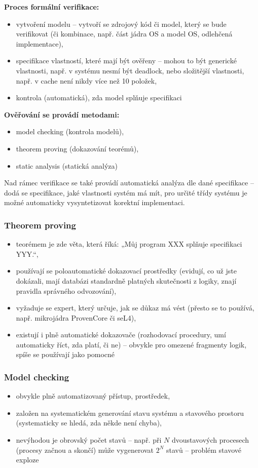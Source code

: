 \documentclass[a4paper, 11pt]{article}
\begin{document}
\textbf{Proces formální verifikace:}
\begin{itemize}
    \item vytvoření modelu -- vytvoří se zdrojový kód či model, který se bude verifikovat (či kombinace, např. část jádra OS a model OS, odlehčená implementace),
    \item specifikace vlastností, které mají být ověřeny -- mohou to být generické vlastnosti, např. v systému nesmí být deadlock, nebo složitější vlastnosti, např. v cache není nikdy více než 10 položek,
    \item kontrola (automatická), zda model splňuje specifikaci
\end{itemize}
 
\textbf{Ověřování se provádí metodami:}
\begin{itemize}
    \item model checking (kontrola modelů),
    \item theorem proving (dokazování teorémů),
    \item static analysis (statická analýza)
\end{itemize}
 
Nad rámec verifikace se také provádí automatická analýza dle dané specifikace -- dodá se specifikace, jaké vlastnosti systém má mít, pro určité třídy systému je možné automaticky vysyntetizovat korektní implementaci.
 
\subsubsection{Theorem proving}
\begin{itemize}
 \item teorémem je zde věta, která říká: „Můj program XXX splňuje specifikaci YYY.“,
 \item používají se poloautomatické dokazovací prostředky (evidují, co už jste dokázali, mají databázi standardně platných skutečnosti z logiky, znají pravidla správného odvozování),
 \item vyžaduje se expert, který určuje, jak se důkaz má vést (přesto se to používá, např. mikrojádra ProvenCore či seL4),
 \item existují i plně automatické dokazovače (rozhodovací procedury, umí automaticky říct, zda platí, či ne) -- obvykle pro omezené fragmenty logik, spíše se používají jako pomocné
\end{itemize}

\subsubsection{Model checking}
\begin{itemize}
 \item obvykle plně automatizovaný přístup, prostředek,
 \item založen na systematickém generování stavu systému a stavového prostoru (systematicky se hledá, zda někde není chyba),
 \item nevýhodou je obrovský počet stavů -- např. při $N$ dvoustavových procesech (procesy začnou a skončí) může vygenerovat $2^N$ stavů -- problém stavové exploze
\end{itemize}
\end{document}

